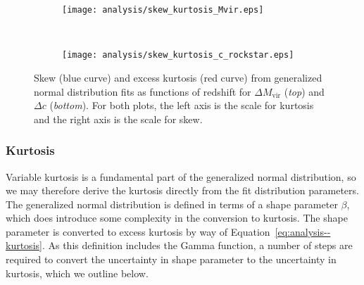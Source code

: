 \begin{figure*}[tp]
	\centering
	\begin{subfigure}{}
		\texttt{[image: analysis/skew\_kurtosis\_Mvir.eps]}
	\end{subfigure}
	\\
	\begin{subfigure}{}
		\texttt{[image: analysis/skew\_kurtosis\_c\_rockstar.eps]}
	\end{subfigure}
	\caption[Skew and kurtosis as functions of redshift for generalized normal fits]{\footnotesize Skew (blue curve) and excess kurtosis (red curve) from generalized normal distribution fits as functions of redshift for $\Delta M_{\mathrm{vir}}$ (\textit{top}) and $\Delta c$ (\textit{bottom}).  For both plots, the left axis is the scale for kurtosis and the right axis is the scale for skew.}
	\label{fig:methods--analysis--fit_trends_skew_kurtosis}
\end{figure*}



\subsubsection{Kurtosis}
\label{subsubsec:analysis--redshift_trends--kurtosis}


Variable kurtosis is a fundamental part of the generalized normal distribution, so we may therefore derive the kurtosis directly from the fit distribution parameters.  The generalized normal distribution is defined in terms of a shape parameter $\beta$, which does introduce some complexity in the conversion to kurtosis.  The shape parameter is converted to excess kurtosis by way of Equation~\ref{eq:analysis--kurtosis}.  As this definition includes the Gamma function, a number of steps are required to convert the uncertainty in shape parameter to the uncertainty in kurtosis, which we outline below.

